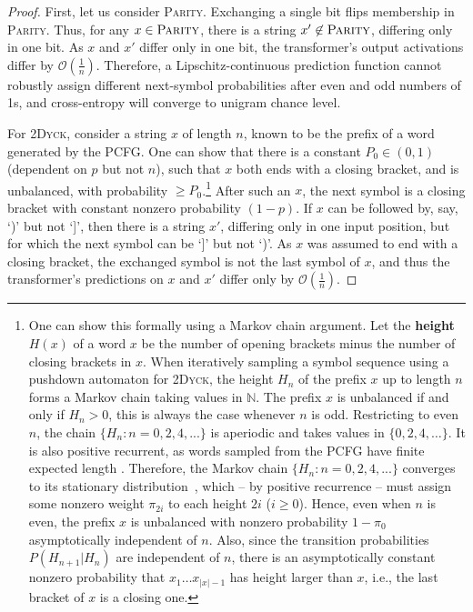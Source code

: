 \documentclass[11pt,a4paper]{article}
\newcommand{\key}[1]{\textbf{#1}}
\begin{document}
\begin{proof}
First, let us consider \textsc{Parity}.
Exchanging a single bit flips membership in \textsc{Parity}.
Thus, for any $x \in \textsc{Parity}$, there is a string $x' \not\in \textsc{Parity}$, differing only in one bit.
As $x$ and $x'$ differ only in one bit, the transformer's output activations differ by $\mathcal{O}(\frac{1}{n})$.
Therefore, a Lipschitz-continuous prediction function cannot robustly assign different next-symbol probabilities after even and odd numbers of 1s, and cross-entropy will converge to unigram chance level.

For \textsc{2Dyck}, consider a string $x$ of length $n$, known to be the prefix of a word generated by the PCFG.
One can show that there is a constant $P_0 \in (0,1)$ (dependent on $p$ but not $n$), such that $x$ both ends with a closing bracket, and is unbalanced, with probability $\geq P_0$.\footnote{One can show this formally using a Markov chain argument.
Let the \key{height} $H(x)$ of a word $x$ be the number of opening brackets minus the number of closing brackets in $x$.
When iteratively sampling a symbol sequence using a pushdown automaton for \textsc{2Dyck}, the height $H_{n}$ of the prefix $x$ up to length $n$ forms a Markov chain taking values in $\mathbb{N}$. 
The prefix $x$ is unbalanced if and only if $H_n>0$, this is always the case whenever $n$ is odd.
Restricting to even $n$, the chain $\{H_{n} : n = 0, 2, 4, ...\}$ is aperiodic and takes values in $\{0, 2, 4, \dots\}$.
It is also positive recurrent, as words sampled from the PCFG have finite expected length \citep[2.2.1]{skachkova2018closing}.
Therefore, the Markov chain $\{H_{n} : n = 0, 2, 4, ...\}$ converges to its stationary distribution~\cite{mitzenmacherprobability}, which -- by positive recurrence -- must assign some nonzero weight $\pi_{2i}$ to each height  $2i$ ($i \geq 0$).
Hence, even when $n$ is even, the prefix $x$ is unbalanced with nonzero probability $1-\pi_0$ asymptotically independent of $n$.
Also, since the transition probabilities $P(H_{n+1}|H_n)$ are independent of $n$, there is an asymptotically constant nonzero probability that $x_1\dots x_{|x|-1}$ has height larger than $x$, i.e., the last bracket of $x$ is a closing one.}
After such an $x$, the next symbol is a closing bracket with constant nonzero probability $(1-p)$.
If $x$ can be followed by, say, `)' but not `]', then there is a string $x'$, differing only in one input position, but for which the next symbol can be `]' but not `)'.
As $x$ was assumed to end with a closing bracket, the exchanged symbol is not the last symbol of $x$, and thus the transformer's predictions on $x$ and $x'$ differ only by $\mathcal{O}(\frac{1}{n})$.

\end{proof}
\end{document}
